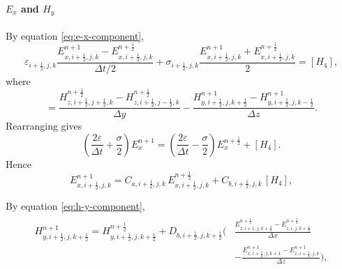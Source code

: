 \documentclass{article}
\numberwithin{equation}{section}
\numberwithin{figure}{section}
\begin{document}
\paragraph{$E_x$ and $H_y$}
By equation \eqref{eq:e-x-component},
\begin{equation}
    \varepsilon_{i+\tfrac12,j,k} \frac{E_{x,i+\tfrac12,j,k}^{n+1}-E_{x,i+\tfrac12,j,k}^{n+\frac12}}{\Delta t/2} + \sigma_{i+\tfrac12,j,k} \frac{E_{x,i+\tfrac12,j,k}^{n+1}+E_{x,i+\tfrac12,j,k}^{n+\frac12}}{2} = [H_4],
    \label{eq:second-e-ex}
\end{equation}
where
\begin{equation}
    [H_4] = \frac{H_{z,i+\tfrac12,j+\tfrac12,k}^{n+\frac12}-H_{z,i+\tfrac12,j-\tfrac12,k}^{n+\frac12}}{\Delta y} - \frac{H_{y,i+\tfrac12,j,k+\tfrac12}^{n+1}-H_{y,i+\tfrac12,j,k-\tfrac12}^{n+1}}{\Delta z}.
\end{equation}
Rearranging gives
\begin{equation}
    \left(\frac{2\varepsilon}{\Delta t}+\frac{\sigma}{2}\right) E_{x}^{n+1} = \left(\frac{2\varepsilon}{\Delta t}-\frac{\sigma}{2}\right) E_{x}^{n+\frac12} + [H_4].
\end{equation}
Hence
\begin{equation}
    E_{x,i+\tfrac12,j,k}^{n+1} = C_{a,i+\tfrac12,j,k}\,E_{x,i+\tfrac12,j,k}^{n+\frac12} + C_{b,i+\tfrac12,j,k}\,[H_4],
    \label{eq:second-e-ex-adi}
\end{equation}

By equation \eqref{eq:h-y-component},
\begin{align}
    \begin{split}
        H_{y,i+\tfrac12,j,k+\tfrac12}^{n+1} = H_{y,i+\tfrac12,j,k+\tfrac12}^{n+\frac12} + D_{b,i+\tfrac12,j,k+\tfrac12}\Big( & \frac{E_{z,i+1,j,k+\tfrac12}^{n+\frac12}-E_{z,i,j,k+\tfrac12}^{n+\frac12}}{\Delta x} \\
                                                                                                                             & - \frac{E_{x,i+\tfrac12,j,k+1}^{n+1}-E_{x,i+\tfrac12,j,k}^{n+1}}{\Delta z}\Big),
    \end{split}
\end{align}
\end{document}
